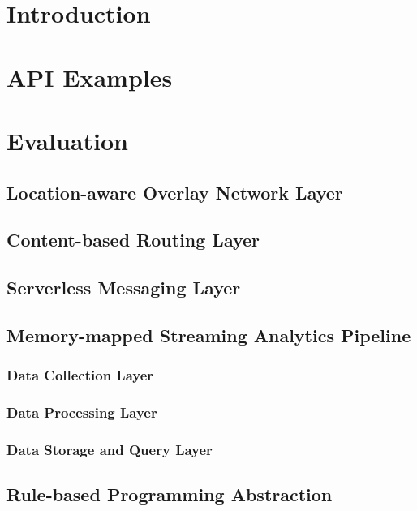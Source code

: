 \section{Introduction}

\section{API Examples}

\section{Evaluation}

\subsection{Location-aware Overlay Network Layer}

\subsection{Content-based Routing Layer}

\subsection{Serverless Messaging Layer}

\subsection{Memory-mapped Streaming Analytics Pipeline}

\subsubsection{Data Collection Layer}

\subsubsection{Data Processing Layer}

\subsubsection{Data Storage and Query Layer}

\subsection{Rule-based Programming Abstraction}

